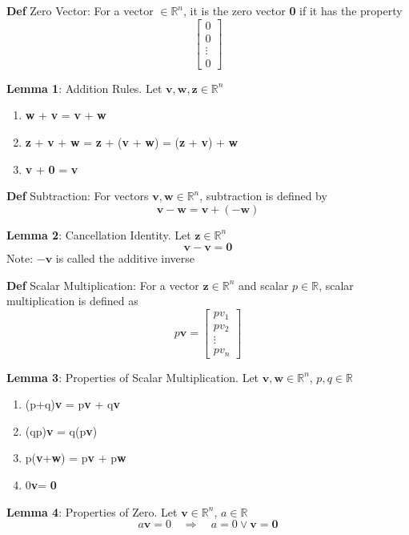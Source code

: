\documentclass[11pt,notitlepage]{report}
\newcommand{\tbf}[1]{\textbf{#1}}
\begin{document}
\textbf{Def} Zero Vector: For a vector $\in \mathbb R^n$, it is the zero vector \tbf 0 if it has the property $$\begin{bmatrix}0\\ 0\\ \vdots\\ 0\end{bmatrix}$$


\textbf{Lemma 1}: Addition Rules. Let $\tbf v, \tbf w, \tbf z \in \mathbb R^n$
\begin{enumerate}[label=(\roman*)]
    \item \tbf w + \tbf v = \tbf v + \tbf w
    \item \tbf z + \tbf v + \tbf w = \tbf z + (\tbf v + \tbf w) = (\tbf z + \tbf v) + \tbf w
    \item \tbf v + \tbf 0 = \tbf v
\end{enumerate}


\textbf{Def} Subtraction: For vectors $\tbf v, \tbf w \in \mathbb R^n$, subtraction is defined by $$\tbf v - \tbf w = \tbf v + (-\tbf w)$$


\textbf{Lemma 2}: Cancellation Identity. Let $\tbf z \in \mathbb R^n$
$$\tbf v-\tbf v = \tbf 0$$
\hspace*{5mm} Note: $-\tbf v$ is called the additive inverse


\textbf{Def} Scalar Multiplication: For a vector $\tbf z \in \mathbb R^n$ and scalar $p \in \mathbb R$, scalar multiplication is defined as $$p\tbf v = \begin{bmatrix}pv_1\\ pv_2\\ \vdots\\ pv_n\end{bmatrix}$$


\textbf{Lemma 3}: Properties of Scalar Multiplication. Let $\tbf v, \tbf w \in \mathbb R^n$, $p, q \in \mathbb R$
\begin{enumerate}[label=(\roman*)]
    \item (p+q)\tbf v = p\tbf v + q\tbf v
    \item (qp)\tbf v = q(p\tbf v)
    \item p(\tbf v+\tbf w) = p\tbf v + p\tbf w
    \item 0\tbf v= \tbf 0
\end{enumerate}


\textbf{Lemma 4}: Properties of Zero. Let $\tbf v \in \mathbb R^n$, $a \in \mathbb R$
$$a\tbf v = 0 \quad \Longrightarrow \quad a = 0 \vee \tbf v = \tbf 0$$
\end{document}
